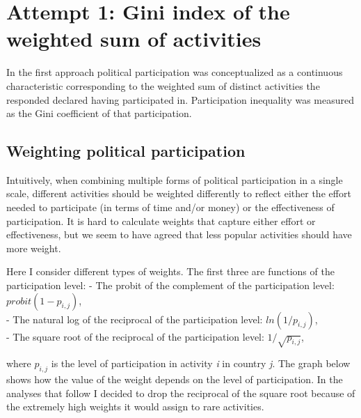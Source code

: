 \documentclass[12pt,]{article}
\begin{document}
\hypertarget{attempt-1-gini-index-of-the-weighted-sum-of-activities}{%
\section{Attempt 1: Gini index of the weighted sum of activities}\label{attempt-1-gini-index-of-the-weighted-sum-of-activities}}

In the first approach political participation was conceptualized as a continuous characteristic corresponding to the weighted sum of distinct activities the responded declared having participated in. Participation inequality was measured as the Gini coefficient of that participation.

\hypertarget{weighting-political-participation}{%
\subsection{Weighting political participation}\label{weighting-political-participation}}

Intuitively, when combining multiple forms of political participation in a single scale, different activities should be weighted differently to reflect either the effort needed to participate (in terms of time and/or money) or the effectiveness of participation. It is hard to calculate weights that capture either effort or effectiveness, but we seem to have agreed that less popular activities should have more weight.

Here I consider different types of weights. The first three are functions of the participation level:
- The probit of the complement of the participation level: \(probit(1 - p_{i,j})\),\\
- The natural log of the reciprocal of the participation level: \(ln(1 / p_{i,j})\),\\
- The square root of the reciprocal of the participation level: \(1/\sqrt{p_{i,j}}\),

where \(p_{i,j}\) is the level of participation in activity \emph{i} in country \emph{j}. The graph below shows how the value of the weight depends on the level of participation. In the analyses that follow I decided to drop the reciprocal of the square root because of the extremely high weights it would assign to rare activities.
\end{document}
